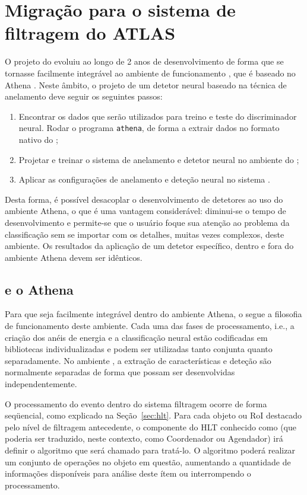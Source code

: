 \section{Migração para o sistema de filtragem do ATLAS}

O projeto do  evoluiu ao longo de 2 anos de desenvolvimento
de forma que se tornasse facilmente integrável ao ambiente de funcionamento
, que é baseado no  Athena
\cite{athena:home-page, athena:devel-guide}. Neste âmbito, o projeto de um
detetor neural baseado na técnica de anelamento deve seguir os seguintes
passos:

\begin{enumerate}
\item Encontrar os dados que serão utilizados para treino e teste do
discriminador neural. Rodar o programa \texttt{athena}, de forma a extrair
dados no formato nativo do ;
\item Projetar e treinar o sistema de anelamento e detetor neural no ambiente
do ;
\item Aplicar as configurações de anelamento e deteção neural no sistema
.
\end{enumerate}

Desta forma, é possível desacoplar o desenvolvimento de detetores ao uso do
ambiente Athena, o que é uma vantagem considerável: diminui-se o tempo de
desenvolvimento e permite-se que o usuário foque sua atenção ao problema da
classificação sem se importar com os detalhes, muitas vezes complexos, deste
ambiente. Os resultados da aplicação de um detetor específico, dentro e fora
do ambiente Athena devem ser idênticos.

\subsection{ e o Athena}

Para que seja facilmente integrável dentro do ambiente Athena, o
 segue a filosofia de funcionamento deste ambiente. Cada uma
das fases de processamento, i.e., a criação dos anéis de energia e a
classificação neural estão codificadas em bibliotecas individualizadas e podem
ser utilizadas tanto conjunta quanto separadamente. No ambiente
, a extração de características e deteção são normalmente
separadas de forma que possam ser desenvolvidas independentemente.

O processamento do evento dentro do sistema filtragem ocorre de forma
seqüencial, como explicado na Seção~\ref{sec:hlt}. Para cada objeto ou RoI
destacado pelo nível de filtragem antecedente, o componente do HLT conhecido
como  (que poderia ser traduzido, neste contexto, como
Coordenador ou Agendador) irá definir o algoritmo que será chamado para
tratá-lo. O algoritmo poderá realizar um conjunto de operações no objeto em
questão, aumentando a quantidade de informações disponíveis para análise deste
ítem ou interrompendo o processamento.

